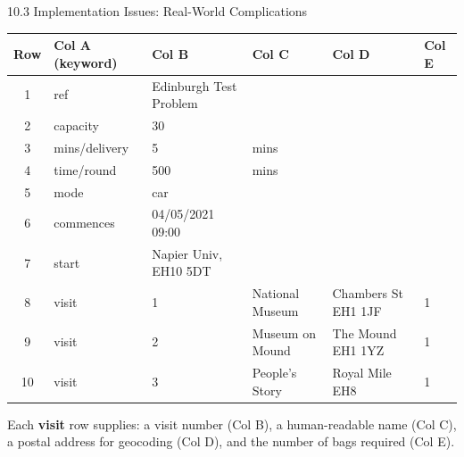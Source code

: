 \documentclass[aspectratio=169,10pt]{beamer}
\begin{document}
\begin{frame}[allowframebreaks]{10.3 Implementation Issues: Real-World Complications}
  \begin{center}
    \small
    \begin{tabular}{cllllp{2cm}}
      \toprule
      \textbf{Row} & \textbf{Col A (keyword)} & \textbf{Col B} &
      \textbf{Col C} & \textbf{Col D} & \textbf{Col E} \\
      \midrule
      1  & ref           & Edinburgh Test Problem & & & \\
      2  & capacity      & 30 & & & \\
      3  & mins/delivery & 5 & mins & & \\
      4  & time/round    & 500 & mins & & \\
      5  & mode          & car & & & \\
      6  & commences     & 04/05/2021 09:00 & & & \\
      7  & start         & Napier Univ, EH10 5DT & & & \\
      8  & visit         & 1 & National Museum & Chambers St EH1 1JF & 1 \\
      9  & visit         & 2 & Museum on Mound & The Mound EH1 1YZ & 1 \\
      10 & visit         & 3 & People's Story & Royal Mile EH8 & 1 \\
      \bottomrule
    \end{tabular}
  \end{center}

  Each \textbf{visit} row supplies: a visit number (Col B), a
  human-readable name (Col C), a postal address for geocoding (Col D),
  and the number of bags required (Col E).

\end{frame}
\end{document}
